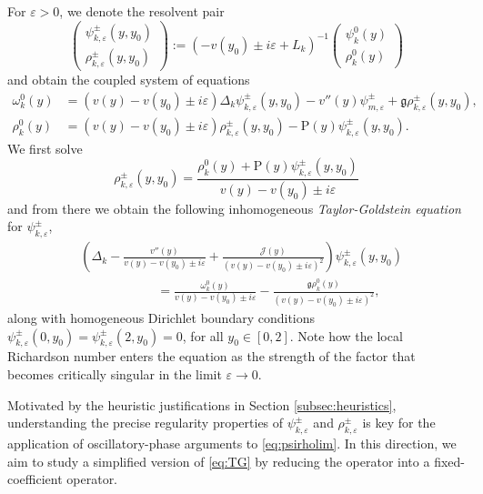 \documentclass[11pt,reqno]{amsproc}
\theoremstyle{definition}
\numberwithin{equation}{section}
\newcommand{\cJ}{{\mathcal{J}}}
\newcommand{\D}{{\Delta}}
\renewcommand{\o}{{\omega}}
\newcommand{\ep}{\varepsilon}
\renewcommand{\l}{\left}
\renewcommand{\r}{\right}
\begin{document}
For $\ep>0$, we denote the resolvent pair
\begin{equation}\label{eq:geneigen}
\begin{pmatrix}
\psi^{\pm}_{k,\ep}(y,y_0) \\ \rho^\pm_{k,\ep}(y,y_0)
\end{pmatrix}:=\l( -v(y_0)\pm i\ep+L_k\r)^{-1}\begin{pmatrix}
\psi_k^0(y) \\ \rho_k^0(y)
\end{pmatrix}
\end{equation}
and obtain the coupled system of equations
\begin{equation*}
\begin{aligned}
\o_k^0(y)&=(v(y)-v(y_0)\pm i\ep)\D_k\psi^\pm_{k,\ep}(y,y_0) - v''(y)\psi_{m,\ep}^\pm+\mathfrak{g} \rho^\pm_{k,\ep}(y,y_0), \\
\rho_k^0(y)&=(v(y)-v(y_0)\pm i\ep)\rho^\pm_{k,\ep}(y,y_0) -\mathrm{P}(y)\psi^\pm_{k,\ep}(y,y_0).
\end{aligned}
\end{equation*}
We first solve
\begin{equation}\label{eq:rhomep}
\rho^\pm_{k,\ep}(y,y_0)=\frac{\rho_k^0(y) + \mathrm{P}(y)\psi^\pm_{k,\ep}(y,y_0)}{v(y)-v(y_0)\pm i\ep}
\end{equation}
and from there we obtain the following inhomogeneous \emph{Taylor-Goldstein equation} for $\psi^\pm_{k,\ep}$,
\begin{equation}\tag{TG}\label{eq:TG}
\begin{split}
&\left(\Delta_k-\frac{v''(y)}{v(y)-v(y_0)\pm i\ep}+\frac{\cJ(y)}{(v(y)-v(y_0)\pm i\ep)^2}\right)\psi_{k,\ep}^\pm(y,y_0) \\
&\qquad\qquad\qquad=\frac{\omega_k^0(y)}{v(y)-v(y_0)\pm i\ep}-\frac{\mathfrak{g}\rho_k^0(y)}{(v(y)-v(y_0)\pm i\ep)^2},
\end{split}
\end{equation}
along with homogeneous Dirichlet boundary conditions $\psi_{k,\ep}^\pm(0,y_0) = \psi_{k,\ep}^\pm(2,y_0) = 0$, for all $y_0\in [0,2]$. Note how the local Richardson number enters the equation as the strength of the factor that becomes critically singular in the limit $\ep\to0$.

Motivated by the heuristic justifications in Section  \ref{subsec:heuristics}, understanding the precise regularity properties of $\psi_{k,\ep}^\pm$ and $\rho_{k,\ep}^\pm$ is key for the application of oscillatory-phase arguments to \eqref{eq:psirholim}. In this direction, we aim to study a simplified version of \eqref{eq:TG} by reducing the operator into a  fixed-coefficient operator. 
\end{document}
